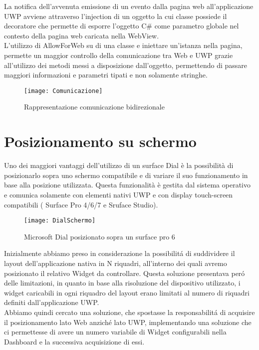 La notifica dell'avvenuta emissione di un evento dalla pagina web all'applicazione UWP avviene attraverso l'injection di un oggetto la cui classe possiede il decoratore \emph{\@AllowForWeb} che permette di esporre l'oggetto C\# come parametro globale nel contesto della pagina web caricata nella WebView.\\

L'utilizzo di AllowForWeb su di una classe e iniettare un'istanza nella pagina, permette un maggior controllo della comunicazione tra Web e UWP grazie all'utilizzo dei metodi messi a disposizione dall'oggetto, permettendo di passare maggiori informazioni e parametri tipati e non solamente stringhe.
\begin{figure}[htpb!]
  \centering
  \texttt{[image: Comunicazione]}
  \caption{Rappresentazione comunicazione bidirezionale}
\end{figure}

\newpage
\section{Posizionamento su schermo}

Uno dei maggiori vantaggi dell’utilizzo di un surface Dial è la possibilità di posizionarlo sopra uno schermo compatibile e di variare il suo funzionamento in base alla posizione utilizzata.
Questa funzionalità è gestita dal sistema operativo e comunica solamente con elementi nativi UWP e con  display touch-screen compatibili ( Surface Pro 4/6/7 e Sruface Studio).

\begin{figure}[htpb!]
  \centering
  \texttt{[image: DialSchermo]}
  \caption{Microsoft Dial posizionato sopra un surface pro 6}
\end{figure}
Inizialmente abbiamo preso in considerazione la possibilitá di suddividere il layout dell’applicazione nativa in N riquadri, all’interno dei quali avremo posizionato il relativo Widget da controllare. Questa soluzione presentava peró delle limitazioni, in quanto in base alla risoluzione del dispositivo utilizzato, i widget caricabili in ogni riquadro del layout erano limitati al numero di riquadri definiti dall'applicazione UWP.\\
Abbiamo quindi cercato una soluzione, che spostasse la responsabilitá di acquisire il posizionamento lato Web anziché lato UWP, implementando una soluzione che ci permettesse di avere un numero variabile di Widget configurabili nella Dashboard e la successiva acquisizione di essi.\\

